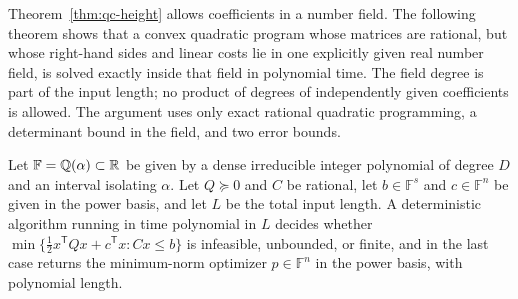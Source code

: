 Theorem~\ref{thm:qc-height} allows coefficients in a number field. The
following theorem shows that a convex quadratic program whose matrices are
rational, but whose right-hand sides and linear costs lie in one explicitly
given real number field, is solved exactly inside that field in polynomial
time. The field degree is part of the input length; no product of degrees of
independently given coefficients is allowed. The argument uses only exact
rational quadratic programming, a determinant bound in the field, and two
error bounds.

\begin{theorem}
\label{thm:qc-number-field-qp}
Let $\mathbb F=\mathbb Q(\alpha)\subset\mathbb R$ be given by a dense irreducible integer
polynomial of degree $D$ and an interval isolating $\alpha$. Let $Q\succeq0$
and $C$ be rational, let $b\in\mathbb F^s$ and $c\in\mathbb F^n$ be given in the
power basis, and let $L$ be the total input length. A deterministic algorithm
running in time polynomial in $L$ decides whether
$\min\{\tfrac12x^{\mathsf T}Qx+c^{\mathsf T}x:Cx\le b\}$ is infeasible,
unbounded, or finite, and in the last case returns the minimum-norm optimizer
$p\in\mathbb F^n$ in the power basis, with polynomial length.
\end{theorem}

